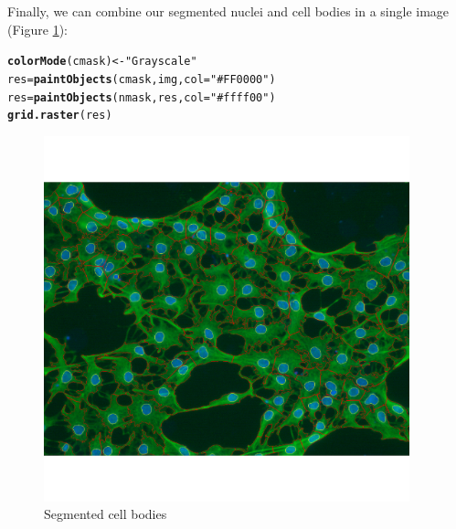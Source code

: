 \documentclass{article}\usepackage[]{graphicx}\usepackage[]{color}
\makeatletter
\newcommand{\hlstr}[1]{\textcolor[rgb]{0.192,0.494,0.8}{#1}}%
\newcommand{\hlstd}[1]{\textcolor[rgb]{0.345,0.345,0.345}{#1}}%
\newcommand{\hlkwb}[1]{\textcolor[rgb]{0.69,0.353,0.396}{#1}}%
\newcommand{\hlkwc}[1]{\textcolor[rgb]{0.333,0.667,0.333}{#1}}%
\newcommand{\hlkwd}[1]{\textcolor[rgb]{0.737,0.353,0.396}{\textbf{#1}}}%
\newenvironment{kframe}{%
 \def\at@end@of@kframe{}%
 \ifinner\ifhmode%
  \def\at@end@of@kframe{\end{minipage}}%
  \begin{minipage}{\columnwidth}%
 \fi\fi%
 \def\FrameCommand##1{\hskip\@totalleftmargin \hskip-\fboxsep
 \colorbox{shadecolor}{##1}\hskip-\fboxsep
     \hskip-\linewidth \hskip-\@totalleftmargin \hskip\columnwidth}%
 \MakeFramed {\advance\hsize-\width
   \@totalleftmargin\z@ \linewidth\hsize
   \@setminipage}}%
 {\par\unskip\endMakeFramed%
 \at@end@of@kframe}
\newenvironment{knitrout}{}{} %
\makeatother
\begin{document}
Finally, we can combine our segmented nuclei and cell bodies in a single image (Figure \ref{fig:res}):
\begin{knitrout}
\color{fgcolor}\begin{kframe}
\begin{alltt}
\hlkwd{colorMode}\hlstd{(cmask)} \hlkwb{<-} \hlstr{"Grayscale"}
\hlstd{res} \hlkwb{=} \hlkwd{paintObjects}\hlstd{(cmask, img,} \hlkwc{col}\hlstd{=}\hlstr{"#FF0000"}\hlstd{)}
\hlstd{res} \hlkwb{=} \hlkwd{paintObjects}\hlstd{(nmask, res,} \hlkwc{col}\hlstd{=}\hlstr{"#ffff00"}\hlstd{)}
\hlkwd{grid.raster}\hlstd{(res)}
\end{alltt}
\end{kframe}\begin{figure}

{\centering \includegraphics[width=400px]{knit_figure/figres-1} 

}

\caption[Segmented cell bodies]{Segmented cell bodies\label{fig:res}}
\end{figure}


\end{knitrout}
\end{document}
